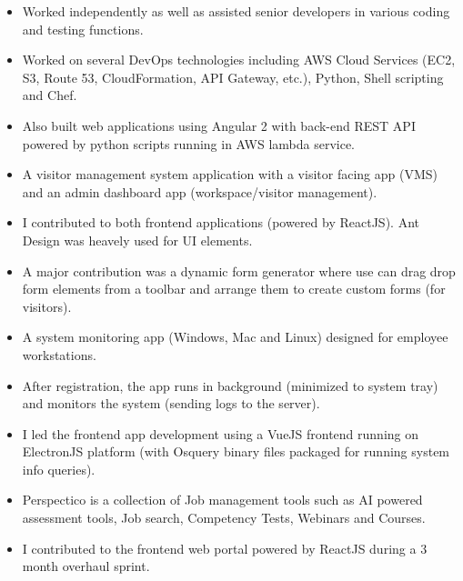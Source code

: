 \documentclass[10pt,a4paper,ragged2e]{altacv}
\begin{document}
\divider

\begin{itemize}
\item Worked independently as well as assisted senior developers in various coding and testing functions. 
\smallskip
\item Worked on several DevOps technologies including AWS Cloud Services (EC2, S3, Route 53,
CloudFormation, API Gateway, etc.), Python, Shell scripting and Chef. 
\smallskip
\item Also built web applications using Angular 2 with back-end REST API powered by python scripts running in
AWS lambda service.
\end{itemize}



\begin{itemize}
\item A visitor management system application with a visitor facing app (VMS) and an admin dashboard app (workspace/visitor management).
\item I contributed to both frontend applications (powered by ReactJS). Ant Design was heavely used for UI elements. 
\item A major contribution was a dynamic form generator where use can drag drop form elements from a toolbar and arrange them to create custom forms (for visitors).
\end{itemize}
\smallskip
\smallskip 


\begin{itemize}
\item A system monitoring app (Windows, Mac and Linux) designed for employee workstations.
\item After registration, the app runs in background (minimized to system tray) and monitors the system (sending logs to the server).
\item I led the frontend app development using a VueJS frontend running on ElectronJS platform (with Osquery binary files packaged for running system info queries).
\end{itemize}
\smallskip
\smallskip


\begin{itemize}
\item Perspectico is a collection of Job management tools such as AI powered assessment tools, Job search, Competency Tests, Webinars and Courses.
\item I contributed to the frontend web portal powered by ReactJS during a 3 month overhaul sprint. 
\end{itemize}
\smallskip
\smallskip 
\end{document}
